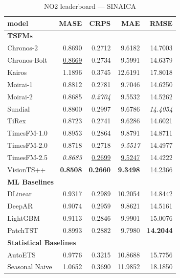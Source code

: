 \begin{table}[H]
\caption{NO2 leaderboard --- SINAICA}
\centering
\begin{small}
\begin{tabular}{lrrrr}
\toprule
model & MASE & CRPS & MAE & RMSE \\
\midrule
\multicolumn{5}{l}{\textbf{TSFMs}} \\
Chronos-2 & 0.8690 & 0.2712 & 9.6182 & 14.7003 \\
Chronos-Bolt & \underline{0.8669} & 0.2734 & 9.5991 & 14.6379 \\
Kairos & 1.1896 & 0.3745 & 12.6191 & 17.8018 \\
Moirai-1 & 0.8812 & 0.2781 & 9.7046 & 14.6250 \\
Moirai-2 & 0.8685 & \textit{0.2704} & 9.5532 & 14.5262 \\
Sundial & 0.8800 & 0.2997 & 9.6786 & \textit{14.4054} \\
TiRex & 0.8723 & 0.2741 & 9.6286 & 14.6021 \\
TimesFM-1.0 & 0.8953 & 0.2864 & 9.8791 & 14.8711 \\
TimesFM-2.0 & 0.8718 & 0.2718 & \textit{9.5517} & 14.4977 \\
TimesFM-2.5 & \textit{0.8683} & \underline{0.2699} & \underline{9.5247} & 14.4222 \\
VisionTS++ & \textbf{0.8508} & \textbf{0.2660} & \textbf{9.3498} & \underline{14.2366} \\
\midrule
\multicolumn{5}{l}{\textbf{ML Baselines}} \\
DLinear & 0.9317 & 0.2989 & 10.2054 & 14.8442 \\
DeepAR & 0.9074 & 0.2959 & 9.8621 & 14.5161 \\
LightGBM & 0.9113 & 0.2846 & 9.9901 & 15.0076 \\
PatchTST & 0.8993 & 0.2882 & 9.7980 & \textbf{14.2044} \\
\midrule
\multicolumn{5}{l}{\textbf{Statistical Baselines}} \\
AutoETS & 0.9776 & 0.3215 & 10.8688 & 15.7756 \\
Seasonal Naive & 1.0652 & 0.3690 & 11.9852 & 18.1850 \\
\bottomrule
\end{tabular}
\end{small}
\end{table}